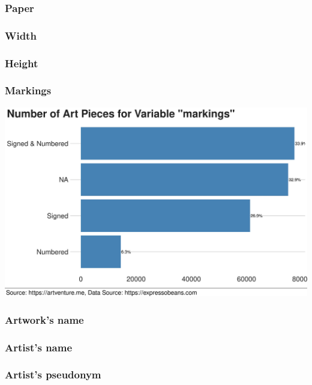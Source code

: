 \documentclass[
]{article}
\begin{document}
\hypertarget{paper}{%
\subsubsection{Paper}\label{paper}}

\hypertarget{width}{%
\subsubsection{Width}\label{width}}

\hypertarget{height}{%
\subsubsection{Height}\label{height}}

\hypertarget{markings}{%
\subsubsection{Markings}\label{markings}}

\includegraphics[width=46.29in]{markings}

\hypertarget{artworks-name}{%
\subsubsection{Artwork's name}\label{artworks-name}}

\hypertarget{artists-name}{%
\subsubsection{Artist's name}\label{artists-name}}

\hypertarget{artists-pseudonym}{%
\subsubsection{Artist's pseudonym}\label{artists-pseudonym}}
\end{document}
